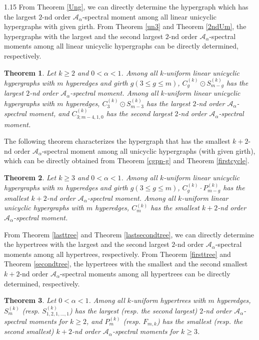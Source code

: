 \documentclass[preprint,12pt]{elsarticle1}
\newtheorem{thm}{Theorem}[section]
\numberwithin{equation}{section}
\begin{document}
\begin{spacing}{1.15}
From Theorem \ref{Ung}, we can directly determine the hypergraph which has the largest $2$-nd order $\mathcal{A}_{\alpha}$-spectral moment among all linear unicyclic hypergraphs with given girth.
From Theorem \ref{un3} and Theorem \ref{2ndUm}, the hypergraphs with the largest and the second largest $2$-nd order $\mathcal{A}_{\alpha}$-spectral moments among all linear unicyclic hypergraphs can be directly determined, respectively.

\begin{thm}
Let $k\ge2$ and $0<\alpha<1$.
Among all $k$-uniform linear unicyclic hypergraphs with $m$ hyperedges and girth $g(3\le g\le m)$, $C_{g}^{(k)}\odot S_{m-g}^{(k)}$ has the largest $2$-nd order $\mathcal{A}_{\alpha}$-spectral moment.
Among all $k$-uniform linear unicyclic hypergraphs with $m$ hyperedges, $C_{3}^{(k)}\odot S_{m-3}^{(k)}$ has the largest $2$-nd order $\mathcal{A}_{\alpha}$-spectral moment, and $C_{3;m-4,1,0}^{(k)}$ has the second largest $2$-nd order $\mathcal{A}_{\alpha}$-spectral moment.
\end{thm}

The following theorem characterizes the hypergraph that has the smallest $k+2$-nd order $\mathcal{A}_{\alpha}$-spectral moment among all unicyclic hypergraphs (with given girth), which can be directly obtained from Theorem \ref{cgpn-g} and Theorem \ref{firstcycle}.

\begin{thm}
Let $k\ge3$ and $0<\alpha<1$.
Among all $k$-uniform linear unicyclic hypergraphs with $m$ hyperedges and girth $g(3\le g\le m)$, $C_{g}^{(k)}\cdot P_{m-g}^{(k)}$ has the smallest $k+2$-nd order $\mathcal{A}_{\alpha}$-spectral moment.
Among all $k$-uniform linear unicyclic hypergraphs with $m$ hyperedges, $C_{m}^{(k)}$ has the smallest $k+2$-nd order $\mathcal{A}_{\alpha}$-spectral moment.
\end{thm}

From Theorem \ref{lasttree} and Theorem \ref{lastsecondtree}, we can directly determine the hypertrees with the largest and the second largest $2$-nd order $\mathcal{A}_{\alpha}$-spectral moments among all hypertrees, respectively. From Theorem \ref{firsttree} and Theorem \ref{secondtree}, the hypertrees with the smallest and the second smallest $k+2$-nd order $\mathcal{A}_{\alpha}$-spectral moments among all hypertrees can be directly determined, respectively.

\begin{thm}
Let $0<\alpha<1$.
Among all $k$-uniform hypertrees with $m$ hyperedges, $S_{m}^{(k)}$ (resp. $S_{1,2,1,\ldots,1}^{(k)}$) has the largest (resp. the second largest) $2$-nd order $\mathcal{A}_{\alpha}$-spectral moments for $k\ge2$, and $P_{m}^{(k)}$ (resp. $F_{m,k}$) has the smallest (resp. the second smallest) $k+2$-nd order $\mathcal{A}_{\alpha}$-spectral moments for $k\ge3$.
\end{thm}





\end{spacing}
\end{document}
